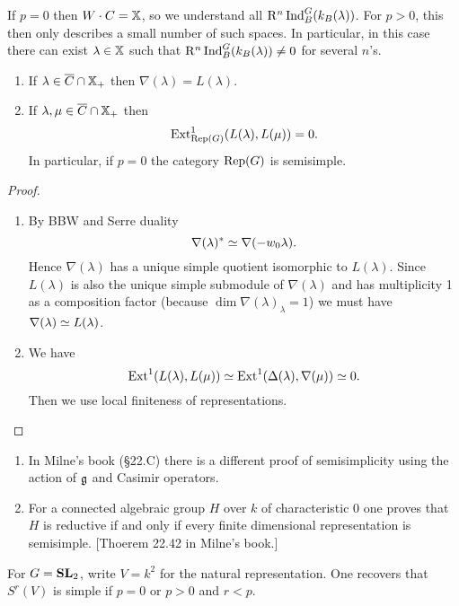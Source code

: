 \begin{remark}
	If $p=0$ then $W\cdot C=\mathbb{X}$, so we understand all $\mathrm{R}^{n}\operatorname{Ind}_B^{G}(k_B(\lambda))$. For $p>0$, this then only describes a small number of such spaces. In particular, in this case there can exist $\lambda\in \mathbb{X}$ such that $\mathrm{R}^{n}\operatorname{Ind}_B^{G}(k_B(\lambda))\neq 0$ for several $n$'s.
\end{remark}
\begin{corollary}\leavevmode
	\begin{enumerate}[(1)]
		\item If $\lambda\in \overline{C}\cap \mathbb{X}_+$ then $\nabla(\lambda)=L(\lambda)$.
		\item If $\lambda,\mu\in \overline{C}\cap \mathbb{X}_+$ then
			\[
			\operatorname{Ext}_{\operatorname{Rep}(G)}^{1}(L(\lambda),L(\mu)) = 0.
			\] 
			In particular, if $p=0$ the category $\operatorname{Rep}(G)$ is semisimple.
	\end{enumerate}
\end{corollary}
\begin{proof}\leavevmode
	\begin{enumerate}[(1)]
		\item By BBW and Serre duality
			\[
			\nabla(\lambda)^{*} \simeq \nabla(-w_0\lambda).
			\] 
			Hence $\nabla(\lambda)$ has a unique simple quotient isomorphic to $L(\lambda)$. Since $L(\lambda)$ is also the unique simple submodule of $\nabla(\lambda)$ and has multiplicity 1 as a composition factor (because $\dim \nabla(\lambda)_\lambda=1$) we must have $\nabla(\lambda)\simeq L(\lambda)$.
		\item We have
			\[
			\operatorname{Ext} ^{1}(L(\lambda),L(\mu)) \simeq \operatorname{Ext} ^{1}(\Delta(\lambda), \nabla(\mu)) \simeq 0.
			\] 
			Then we use local finiteness of representations.
	\end{enumerate}
\end{proof}
\begin{remark}\leavevmode
	\begin{enumerate}[(1)]
		\item In Milne's book (§22.C) there is a different proof of semisimplicity using the action of $\mathfrak g$ and Casimir operators.
		\item For a connected algebraic group $H$ over $k$ of characteristic 0 one proves that $H$ is reductive if and only if every finite dimensional representation is semisimple. [Thoerem 22.42 in Milne's book.]
	\end{enumerate}
\end{remark}
\begin{example}
	For $G=\mathbf{SL}_2$, write $V=k^2$ for the natural representation. One recovers that $S^{r}(V)$ is simple if $p=0$ or $p>0$ and $r<p$.
\end{example}

